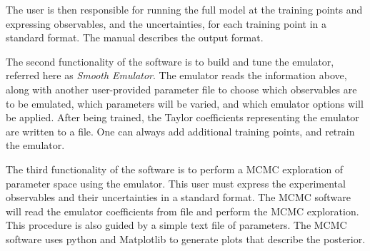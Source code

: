 \documentclass[12pt]{article}
\numberwithin{equation}{section}
\numberwithin{figure}{section}
\begin{document}
 The user is then responsible for running the full model at the training points and expressing observables, and the uncertainties, for each training point in a standard format. The manual describes the output format.

 The second functionality of the software is to build and tune the emulator, referred here as {\it {\it Smooth Emulator}}. The emulator reads the information above, along with another user-provided parameter file to choose which observables are to be emulated, which parameters will be varied, and which emulator options will be applied. After being trained, the Taylor coefficients representing the emulator are written to a file. One can always add additional training points, and retrain the emulator. 

The third functionality of the software is to perform a MCMC exploration of parameter space using the emulator. This user must express the experimental observables and their uncertainties in a standard format. The MCMC software will read the emulator coefficients from file and perform the MCMC exploration. This procedure is also guided by a simple text file of parameters. The MCMC software uses python and Matplotlib to generate plots that describe the posterior. 


\newpage



\newpage



\newpage



\newpage



\newpage



\newpage



\newpage



\newpage


\end{document}
